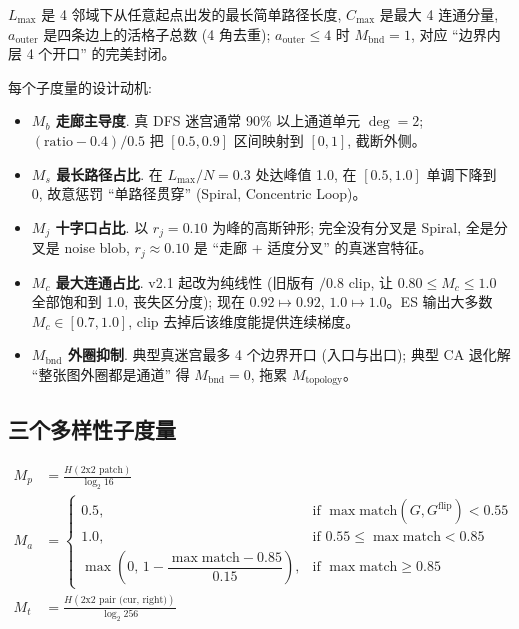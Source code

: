 $L_{\max}$ 是 4 邻域下从任意起点出发的最长简单路径长度, $C_{\max}$ 是最大 4 连通分量, $a_{\text{outer}}$ 是四条边上的活格子总数 (4 角去重); $a_{\text{outer}} \le 4$ 时 $M_{\text{bnd}} = 1$, 对应 ``边界内层 4 个开口'' 的完美封闭。

每个子度量的设计动机:
\begin{itemize}[leftmargin=*, itemsep=0pt, topsep=0pt]
  \item \textbf{$M_b$ 走廊主导度}. 真 DFS 迷宫通常 90\% 以上通道单元 $\deg=2$; $(\mathrm{ratio} - 0.4)/0.5$ 把 $[0.5, 0.9]$ 区间映射到 $[0, 1]$, 截断外侧。
  \item \textbf{$M_s$ 最长路径占比}. 在 $L_{\max}/N = 0.3$ 处达峰值 1.0, 在 $[0.5, 1.0]$ 单调下降到 0, 故意惩罚 ``单路径贯穿'' (Spiral, Concentric Loop)。
  \item \textbf{$M_j$ 十字口占比}. 以 $r_j = 0.10$ 为峰的高斯钟形; 完全没有分叉是 Spiral, 全是分叉是 noise blob, $r_j \approx 0.10$ 是 ``走廊 + 适度分叉'' 的真迷宫特征。
  \item \textbf{$M_c$ 最大连通占比}. v2.1 起改为纯线性 (旧版有 $/0.8$ clip, 让 $0.80 \le M_c \le 1.0$ 全部饱和到 1.0, 丧失区分度); 现在 $0.92 \mapsto 0.92$, $1.0 \mapsto 1.0$。ES 输出大多数 $M_c \in [0.7, 1.0]$, clip 去掉后该维度能提供连续梯度。
  \item \textbf{$M_{\text{bnd}}$ 外圈抑制}. 典型真迷宫最多 4 个边界开口 (入口与出口); 典型 CA 退化解 ``整张图外圈都是通道'' 得 $M_{\text{bnd}} = 0$, 拖累 $M_{\text{topology}}$。
\end{itemize}

\subsection{三个多样性子度量}
\begin{align}
  M_p &= \frac{H(\text{2x2 patch})}{\log_2 16} \label{eq:mp}\\
  M_a &= \begin{cases}
    0.5, & \text{if } \max \mathrm{match}(G, G^{\text{flip}}) < 0.55 \\
    1.0, & \text{if } 0.55 \le \max \mathrm{match} < 0.85 \\
    \max\!\left(0,\, 1 - \dfrac{\max \mathrm{match} - 0.85}{0.15}\right), & \text{if } \max \mathrm{match} \ge 0.85
  \end{cases} \label{eq:ma}\\
  M_t &= \frac{H(\text{2x2 pair (cur, right)})}{\log_2 256} \label{eq:mt}
\end{align}

